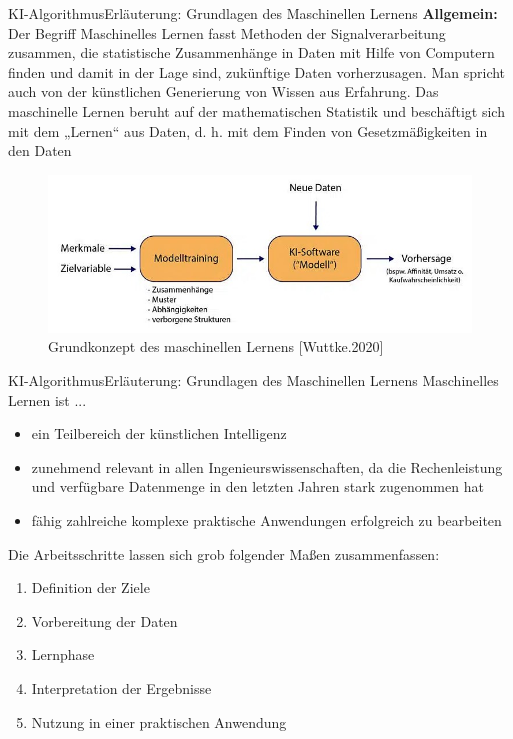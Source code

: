 \documentclass[169, handout	]{THIbeamer} %
\begin{document}
	\begin{frame}{KI-Algorithmus}{Erläuterung: Grundlagen des Maschinellen Lernens}
		\footnotesize
		\textbf{Allgemein:} Der Begriff Maschinelles Lernen fasst Methoden der Signalverarbeitung zusammen, die statistische Zusammenhänge in Daten mit Hilfe von Computern finden und damit in der Lage sind, zukünftige Daten vorherzusagen. Man spricht auch von der künstlichen Generierung von Wissen aus Erfahrung. Das maschinelle Lernen beruht auf der mathematischen Statistik und beschäftigt sich mit dem „Lernen“ aus Daten, d. h. mit dem Finden von Gesetzmäßigkeiten in den Daten\\
		\begin{figure}
			\includegraphics[scale=0.5]{required/ML_Einfuhrung.jpg}
			\caption{Grundkonzept des maschinellen Lernens [Wuttke.2020]}
        	\label{Ground Subtraction}
       	\end{figure}

	\end{frame}
	\begin{frame}{KI-Algorithmus}{Erläuterung: Grundlagen des Maschinellen Lernens}
		Maschinelles Lernen ist ...
		\begin{itemize}
			\item ein Teilbereich der künstlichen Intelligenz
			\item zunehmend relevant in allen Ingenieurswissenschaften, da die Rechenleistung und verfügbare Datenmenge in den letzten Jahren stark zugenommen hat
			\item fähig zahlreiche komplexe praktische Anwendungen erfolgreich zu bearbeiten
	\end{itemize}		
		Die Arbeitsschritte lassen sich grob folgender Maßen zusammenfassen:
		\begin{enumerate}
			\item Definition der Ziele
			\item Vorbereitung der Daten
			\item Lernphase
			\item Interpretation der Ergebnisse
			\item Nutzung in einer praktischen Anwendung
		\end{enumerate}
	\end{frame}
\end{document}
